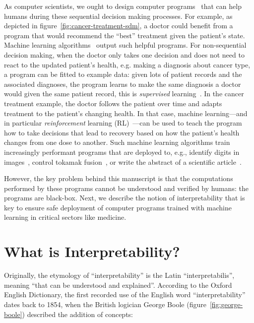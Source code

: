 As computer scientists, we ought to design computer programs~\cite{knuth63} that can help humans during these sequential decision making processes. 
For example, as depicted in figure~\ref{fig:cancer-treatment-sdm}, a doctor could benefit from a program that would recommend the ``best'' treatment given the patient's state. 
Machine learning algorithms~\cite{turing} output such helpful programs.
For non-sequential decision making, when the doctor only takes one decision and does not need to react to the updated patient's health, e.g. making a diagnosis about cancer type, a program can be fitted to example data: given lots of patient records and the associated diagnoses, the program learns to make the same diagnosis a doctor would given the same patient record, this is \textit{supervised} learning~\cite{sl}. 
In the cancer treatment example, the doctor follows the patient over time and adapts treatment to the patient's changing health. In that case, machine learning—and in particular \textit{reinforcement} learning (RL)~\cite{sutton}—can be used to teach the program how to take decisions that lead to recovery based on how the patient's health changes from one dose to another.  
Such machine learning algorithms train increasingly performant programs that are deployed to, e.g., identify digits in images~\cite{lenet}, control tokamak fusion~\cite{tokamak}, or write the abstract of a scientific article~\cite{bert}.

However, the key problem behind this manuscript is that the computations performed by these programs cannot be understood and verified by humans: the programs are black-box.
Next, we describe the notion of interpretability that is key to ensure safe deployment of computer programs trained with machine learning in critical sectors like medicine.

\section{What is Interpretability?}


Originally, the etymology of ``interpretability'' is the Latin ``interpretabilis'', meaning ``that can be understood and explained''.
According to the Oxford English Dictionary, the first recorded use of the English word ``interpretability'' dates back to 1854, when the British logician George Boole (figure~\ref{fig:george-boole}) described the addition of concepts:

